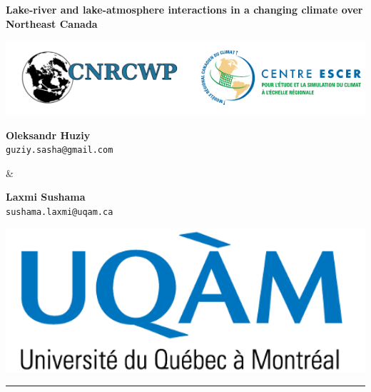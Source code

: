 \documentclass[a0,landscape]{a0poster}
\begin{document}


\noindent\begin{minipage}[b]{\linewidth}
\centering
\noindent \veryHuge \color{NavyBlue} \textbf{Lake-river and lake-atmosphere interactions in a changing climate over Northeast Canada} \color{Black}\\ %
\noindent\begin{minipage}[c]{0.2\linewidth}
      \center
      \includegraphics[width=25cm]{logo_cnrcwp_escer.png} %
\end{minipage} \hfill
%
\begin{minipage}[c]{0.15\linewidth}
  \center
  \Large \textbf{Oleksandr Huziy} \\
  \large \texttt{guziy.sasha@gmail.com}
\end{minipage}
%
\begin{minipage}[b]{0.1\linewidth}
 \center
 \Large\&
\end{minipage}
%
\begin{minipage}[c]{0.15\linewidth}
   \center
   \Large \textbf{Laxmi Sushama} \\
   \large  \texttt{sushama.laxmi@uqam.ca}
\end{minipage}\hfill
%
\begin{minipage}[c]{0.2\linewidth}
  \center
  \includegraphics[width=15cm]{logo_uqam.png} %
\end{minipage}
\rule{\linewidth}{3pt}
\end{minipage}
%
\end{document}
